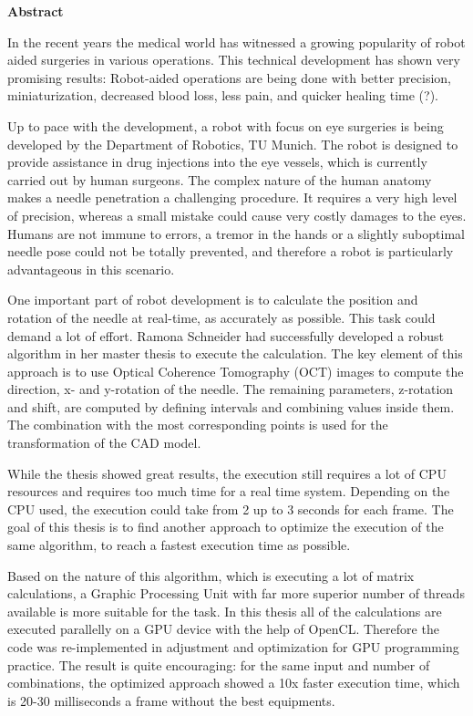 
\cleardoublepage

\vspace*{2cm}
\begin{center}
{\Large \textbf{Abstract}}
\end{center}
\vspace{1cm}
In the recent years the medical world has witnessed a growing popularity of robot aided surgeries in various operations. This technical development has shown very promising results: Robot-aided operations are being done with better precision, miniaturization, decreased blood loss, less pain, and quicker healing time (?). 

Up to pace with the development, a robot with focus on eye surgeries is being developed by the Department of Robotics, TU Munich. The robot is designed to provide assistance in drug injections into the eye vessels, which is currently carried out by human surgeons. The complex nature of the human anatomy makes a needle penetration a challenging procedure. It requires a very high level of precision, whereas a small mistake could cause very costly damages to the eyes. Humans are not immune to errors, a tremor in the hands or a slightly suboptimal needle pose could not be totally prevented, and therefore a robot is particularly advantageous in this scenario.

One important part of robot development is to calculate the position and rotation of the needle at real-time, as accurately as possible. This task could demand a lot of effort. Ramona Schneider had successfully developed a robust algorithm in her master thesis to execute the calculation. The key element of this approach is to use Optical Coherence Tomography (OCT) images to compute the direction, x- and y-rotation of the needle. The remaining parameters, z-rotation and shift, are computed by defining intervals and combining values inside them. The combination with the most corresponding points is used for the transformation of the CAD model.

While the thesis showed great results, the execution still requires a lot of CPU resources and requires too much time for a real time system. Depending on the CPU used, the execution could take from 2 up to 3 seconds for each frame. The goal of this thesis is to find another approach to optimize the execution of the same algorithm, to reach a fastest execution time as possible.

Based on the nature of this algorithm, which is executing a lot of matrix calculations, a Graphic Processing Unit with far more superior number of threads available is more suitable for the task. In this thesis all of the calculations are executed parallelly on a GPU device with the help of OpenCL. Therefore the code was re-implemented in adjustment and optimization for GPU programming practice. The result is quite encouraging: for the same input and number of combinations, the optimized approach showed a 10x faster execution time, which is 20-30 milliseconds a frame without the best equipments. 

